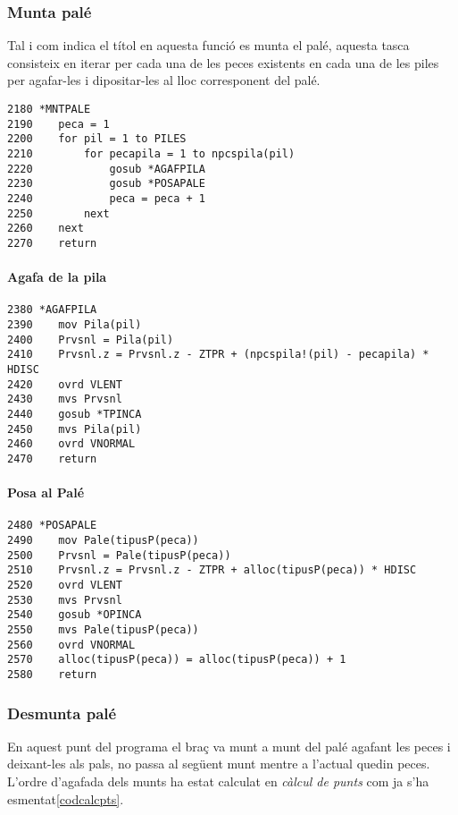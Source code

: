 \subsubsection{Munta palé}
Tal i com indica el títol en aquesta funció es munta el palé, aquesta tasca
consisteix en iterar per cada una de les peces existents en cada una de les
piles per agafar-les i dipositar-les al lloc corresponent del palé.

\begin{verbatim}
2180 *MNTPALE
2190    peca = 1
2200    for pil = 1 to PILES 
2210        for pecapila = 1 to npcspila(pil)
2220            gosub *AGAFPILA
2230            gosub *POSAPALE
2240            peca = peca + 1
2250        next
2260    next
2270    return
\end{verbatim}

\paragraph{Agafa de la pila}
\begin{verbatim}
2380 *AGAFPILA
2390    mov Pila(pil)
2400    Prvsnl = Pila(pil)
2410    Prvsnl.z = Prvsnl.z - ZTPR + (npcspila!(pil) - pecapila) * HDISC
2420    ovrd VLENT
2430    mvs Prvsnl
2440    gosub *TPINCA
2450    mvs Pila(pil)
2460    ovrd VNORMAL
2470    return
\end{verbatim}

\paragraph{Posa al Palé}
\begin{verbatim}
2480 *POSAPALE
2490    mov Pale(tipusP(peca))
2500    Prvsnl = Pale(tipusP(peca))
2510    Prvsnl.z = Prvsnl.z - ZTPR + alloc(tipusP(peca)) * HDISC
2520    ovrd VLENT
2530    mvs Prvsnl
2540    gosub *OPINCA
2550    mvs Pale(tipusP(peca))
2560    ovrd VNORMAL
2570    alloc(tipusP(peca)) = alloc(tipusP(peca)) + 1
2580    return
\end{verbatim}

\subsubsection{Desmunta palé}
En aquest punt del programa el braç va munt a munt del palé agafant les peces
i deixant-les als pals, no passa al següent munt mentre a l'actual quedin peces.
L'ordre d'agafada dels munts ha estat calculat en \emph{càlcul de punts} com ja s'ha
esmentat\ref{codcalcpts}.

